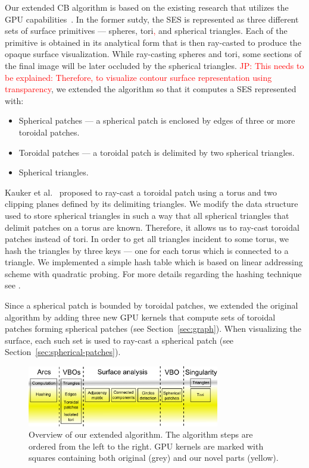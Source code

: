 Our extended CB algorithm is based on the existing research that utilizes the GPU capabilities~\cite{krone2011parallel}.
In the former sutdy, the SES is represented as three different sets of surface primitives --- spheres, tori\textcolor{red}{,} and spherical triangles. Each of the primitive is obtained in its analytical form that is then ray-casted to produce the opaque surface visualization.
While ray-casting spheres and tori, some sections of the final image will be later occluded by the spherical triangles.
\textcolor{red}{JP: This needs to be explained: Therefore, to visualize contour surface representation using transparency}, we extended the algorithm so that it computes a SES represented with:
\begin{itemize}
  \item Spherical patches --- a spherical patch is enclosed by edges of three or more toroidal patches.
	\item Toroidal patches --- a toroidal patch is delimited by two spherical triangles.
	\item Spherical triangles.
\end{itemize}

Kauker et al.~\cite{kauker2013rendering} proposed to ray-cast a toroidal patch using a torus and two clipping planes defined by its delimiting triangles.
We modify the data structure used to store spherical triangles in such a way that all spherical triangles that delimit patches on a torus are known. Therefore, it allows us to ray-cast toroidal patches instead of tori.
In order to get all triangles incident to some torus, we hash the triangles by three keys --- one for each torus which is connected to a triangle.
We implemented a simple hash table which is based on linear addressing scheme with quadratic probing.
For more details regarding the hashing technique see \cite{alcantara2011efficient}.

Since a spherical patch is bounded by toroidal patches, we extended the original algorithm by adding three new GPU kernels that compute sets of toroidal patches forming spherical patches (see Section~\ref{sec:graph}).
When visualizing the surface, each such set is used to ray-cast a spherical patch (see Section~\ref{sec:spherical-patches}).

\begin{figure}[htb]
  \centering
  \includegraphics[width=3.3in]{image/kernels.png}
  \caption{Overview of our extended algorithm.
	The algorithm steps are ordered from the left to the right.
	GPU kernels are marked with squares containing both original (grey) and our novel parts (yellow).}
	\label{fig:kernels}
\end{figure}

